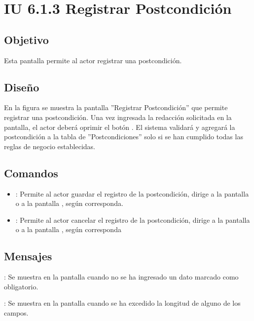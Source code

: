 \section{IU 6.1.3 Registrar Postcondición}

\subsection{Objetivo}
	Esta pantalla permite al actor registrar una postcondición.
\subsection{Diseño}
	En la figura  se muestra la pantalla ''Registrar Postcondición'' que permite registrar una postcondición. Una vez ingresada la redacción solicitada en la pantalla, el actor deberá oprimir el botón  . El sistema validará y agregará la postcondición a la tabla de ''Postcondiciones'' solo si se han cumplido todas las reglas de negocio establecidas.

\subsection{Comandos}
\begin{itemize}
	\item {}: Permite al actor guardar el registro de la postcondición, dirige a la pantalla  o a la pantalla , según corresponda.
	\item {}: Permite al actor cancelar el registro de la postcondición, dirige a la pantalla  o a la pantalla , según corresponda
\end{itemize}

\subsection{Mensajes}

\begin{Citemize}
	\item {}: Se muestra en la pantalla  cuando no se ha ingresado un dato marcado como obligatorio.
	\item {}: Se muestra en la pantalla  cuando se ha excedido la longitud de alguno de los campos.
\end{Citemize}
